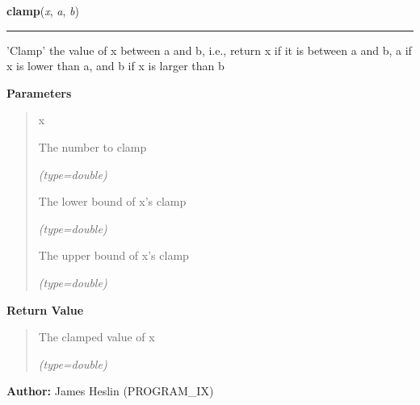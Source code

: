 \hspace{.8\funcindent}\begin{boxedminipage}{\funcwidth}

    \raggedright \textbf{clamp}(\textit{x}, \textit{a}, \textit{b})

    \vspace{-1.5ex}

    \rule{\textwidth}{0.5\fboxrule}
\setlength{\parskip}{2ex}
    'Clamp' the value of x between a and b, i.e., return x if it is between
    a and b, a if x is lower than a, and b if x is larger than b

\setlength{\parskip}{1ex}
      \textbf{Parameters}
      \vspace{-1ex}

      \begin{quote}
        \begin{Ventry}{x}

          \item[x]

          The number to clamp

            {\it (type=double)}

          \item[a]

          The lower bound of x's clamp

            {\it (type=double)}

          \item[b]

          The upper bound of x's clamp

            {\it (type=double)}

        \end{Ventry}

      \end{quote}

      \textbf{Return Value}
    \vspace{-1ex}

      \begin{quote}
      The clamped value of x

      {\it (type=double)}

      \end{quote}

\textbf{Author:} James Heslin (PROGRAM\_IX)



    \end{boxedminipage}

    \label{pystroke:vector2:Vector2:radians_between}


